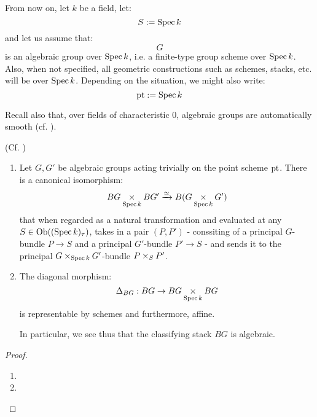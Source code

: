         \begin{convention}
            From now on, let $k$ be a field, let:
                $$S := \operatorname{Spec} k$$
            and let us assume that:
                $$G$$
            is an algebraic group over $\operatorname{Spec} k$, i.e. a finite-type group scheme over $\operatorname{Spec} k$. Also, when not specified, all geometric constructions such as schemes, stacks, etc. will be over $\operatorname{Spec} k$. Depending on the situation, we might also write:
                $$\mathrm{pt} := \operatorname{Spec} k$$
            
            Recall also that, over fields of characteristic $0$, algebraic groups are automatically smooth (cf. \cite[\href{https://stacks.math.columbia.edu/tag/047N}{Tag 047N}]{stacks-project}).
        \end{convention}

        \begin{lemma} \label{lemma: classifying_stacks_are_algebraic}
            (Cf. \cite[Lemmas 2.5.1 and 2.5.2]{wang_algebraicity_of_Bun_G})
            \begin{enumerate}
                \item Let $G, G'$ be algebraic groups acting trivially on the point scheme $\mathrm{pt}$. There is a canonical isomorphism:
                    $$BG \x_{\Spec k} BG' \xrightarrow[]{\cong} B(G \x_{\Spec k} G')$$
                that when regarded as a natural transformation and evaluated at any $S \in \mathrm{Ob}((\operatorname{Spec} k)_{\tau})$, takes in a pair $(P, P')$ - conssiting of a principal $G$-bundle $P \to S$ and a principal $G'$-bundle $P' \to S$ - and sends it to the principal $G \x_{\Spec k} G'$-bundle $P \x_S P'$.
                \item The diagonal morphism:
                    $$\Delta_{BG}: BG \to BG \x_{\Spec k} BG$$
                is representable by schemes and furthermore, affine. 

                In particular, we see thus that the classifying stack $BG$ is algebraic.
            \end{enumerate}
        \end{lemma}
            \begin{proof}
                \begin{enumerate}
                    \item 
                    \item 
                \end{enumerate}
            \end{proof}
